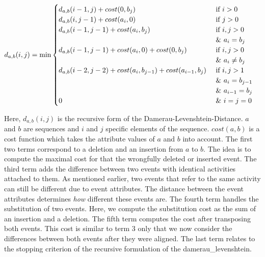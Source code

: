 \documentclass[./../../paper.tex]{subfiles}
\begin{document}
\begin{align}
    \label{eq:modified_dl}
    d_{a, b}(i, j) & =\min
    \begin{cases}
        d_{a, b}(i-1, j  )+cost(0, b_j) & \text { if } i>0                                            \\
        d_{a, b}(i  , j-1)+cost(a_i, 0) & \text { if } j>0                                            \\
        d_{a, b}(i-1, j-1)+cost(a_i, b_j) & \text { if } i, j>0   \\ & \text { \& } a_{i}=b_{j}                                       \\
        d_{a, b}(i-1, j-1)+cost(a_i, 0) + cost(0, b_j) & \text { if } i, j>0  \\ & \text { \& } a_{i} \neq b_{j}                                       \\
        d_{a, b}(i-2, j-2)+cost(a_i, b_{j-1}) + cost(a_{i-1}, b_j) & \text { if } i, j>1 \\ 
        & \text { \& } a_{i}=b_{j-1} \\ 
        & \text { \& } a_{i-1}=b_{j} \\
        0                                 & \text { \& } i=j=0                                          
    \end{cases} 
\end{align}

\noindent Here, $d_{a, b}(i, j)$ is the recursive form of the Damerau-Levenshtein-Distance. $a$ and $b$ are sequences and $i$ and $j$ specific elements of the sequence. $cost(a,b)$ is a cost function which takes the attribute values of $a$ and $b$ into account. 
The first two terms correspond to a deletion and an insertion from $a$ to $b$. The idea is to compute the maximal cost for that the wrongfully deleted or inserted event. 
The third term adds the difference between two events with identical activities attached to them. As mentioned earlier, two events that refer to the same activity can still be different due to event attributes. The distance between the event attributes determines \emph{how} different these events are. 
The fourth term handles the substitution of two events. Here, we compute the substitution cost as the sum of an insertion and a deletion. 
The fifth term computes the cost after transposing both events. This cost is similar to term 3 only that we now consider the differences between both events after they were aligned. The last term relates to the stopping criterion of the recursive formulation of the \gls{damerau_levenshtein}.  
\end{document}
